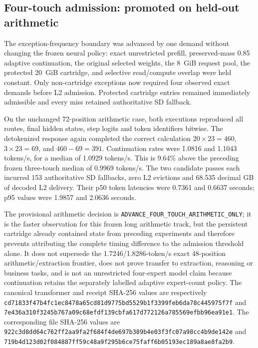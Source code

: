 \subsection{Four-touch admission: promoted on held-out arithmetic}

The exception-frequency boundary was advanced by one demand without changing
the frozen neural policy: exact unrestricted prefill, preserved-mass 0.85
adaptive continuation, the original selected weights, the 8~GiB request pool,
the protected 20~GiB cartridge, and selective read/compute overlap were held
constant.  Only non-cartridge exceptions now required four observed exact
demands before L2 admission.  Protected cartridge entries remained immediately
admissible and every miss retained authoritative SD fallback.

On the unchanged 72-position arithmetic case, both executions reproduced all
routes, final hidden states, step logits and token identifiers bitwise.  The
detokenized response again completed the correct calculation
$20\times23=460$, $3\times23=69$, and $460-69=391$.  Continuation rates were
1.0816 and 1.1043 tokens/s, for a median of 1.0929 tokens/s.  This is 9.64\%
above the preceding frozen three-touch median of 0.9969 tokens/s.  The two
candidate passes each incurred 153 authoritative SD fallbacks, zero L2
evictions and 68.535 decimal GB of decoded L2 delivery.  Their p50 token
latencies were 0.7361 and 0.6637 seconds; p95 values were 1.9857 and 2.0636
seconds.

The provisional arithmetic decision is
\texttt{ADVANCE\_FOUR\_TOUCH\_ARITHMETIC\_ONLY}; it is the faster observation
for this frozen long arithmetic track, but the persistent cartridge already
contained state from preceding experiments and therefore prevents attributing
the complete timing difference to the admission threshold alone.  It does not
supersede the 1.7246/1.8286-token/s exact 48-position arithmetic/extraction
frontier, does not prove transfer to extraction, reasoning or business tasks,
and is not an unrestricted four-expert model claim because continuation retains
the separately labelled adaptive expert-count policy.  The canonical
transformer and receipt SHA-256 values are respectively
\texttt{cd71833f47b4fc1ec8478a65cd81d9775bd5529b1f3399feb6da78c445975f7f}
and
\texttt{7e436a310f3245b767a09c68efdf139cbfa617d772126a785569efbb96ea91e1}.
The corresponding file SHA-256 values are
\texttt{922c3d8dd64c762ff2aa9fa2f684f4de697b389b4e03f3fc07a98cc4b9de142e}
and
\texttt{719b4d123d02f084887ff59c48a9f295b6ce75faff6b05193ec189a8ae8fa2b9}.

